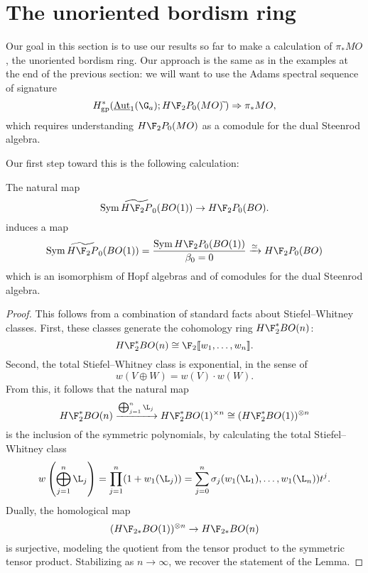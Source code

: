 \section{The unoriented bordism ring}\label{PiStarMOSection}

Our goal in this section is to use our results so far to make a calculation of $\pi_* MO$, the unoriented bordism ring.  Our approach is the same as in the examples at the end of the previous section: we will want to use the Adams spectral sequence of signature \[H^*_{\mathrm{gp}}(\InternalAut_1(\G_a); H\F_2P_0(MO)\widetilde{\:}) \Rightarrow \pi_* MO,\] which requires understanding $H\F_2P_0(MO)$ as a comodule for the dual Steenrod algebra.

Our first step toward this is the following calculation:
\begin{lemma}\label{HF2BOIsSymAlg}
The natural map \[\Sym \widetilde{H\F_2P}_0(BO(1)) \to H\F_2P_0(BO).\] induces a map \[\Sym \widetilde{H\F_2P}_0(BO(1)) = \frac{\Sym H\F_2P_0(BO(1))}{\beta_0 = 0} \xrightarrow{\simeq} H\F_2P_0(BO)\] which is an isomorphism of Hopf algebras and of comodules for the dual Steenrod algebra.
\end{lemma}
\begin{proof}
This follows from a combination of standard facts about Stiefel--Whitney classes.  First, these classes generate the cohomology ring $H\F_2^* BO(n)$: \[H\F_2^* BO(n) \cong \F_2\ps{w_1, \ldots, w_n}.\]  Second, the total Stiefel--Whitney class is exponential, in the sense of \[w(V \oplus W) = w(V) \cdot w(W).\]  From this, it follows that the natural map \[H\F_2^* BO(n) \xrightarrow{\bigoplus_{j=1}^n \L_j} H\F_2^* BO(1)^{\times n} \cong (H\F_2^* BO(1))^{\otimes n}\] is the inclusion of the symmetric polynomials, by calculating the total Stiefel--Whitney class \[w\left( \bigoplus_{j=1}^n \L_j \right) = \prod_{j=1}^n (1 + w_1(\L_j)) = \sum_{j=0}^n \sigma_j(w_1(\L_1), \ldots, w_1(\L_n)) t^j.\]  Dually, the homological map \[(H\F_{2*} BO(1))^{\otimes n} \to H\F_{2*} BO(n)\] is surjective, modeling the quotient from the tensor product to the symmetric tensor product.  Stabilizing as $n \to \infty$, we recover the statement of the Lemma.
\end{proof}

